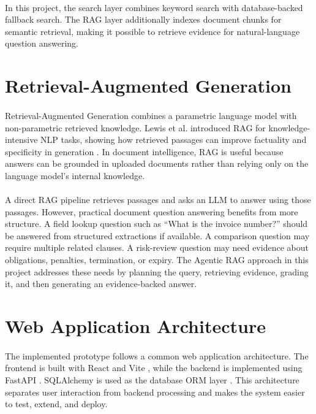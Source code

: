 \paragraph{} In this project, the search layer combines keyword search with database-backed fallback search. The RAG layer additionally indexes document chunks for semantic retrieval, making it possible to retrieve evidence for natural-language question answering.

\section{Retrieval-Augmented Generation}
\paragraph{} Retrieval-Augmented Generation combines a parametric language model with non-parametric retrieved knowledge. Lewis et al. introduced RAG for knowledge-intensive NLP tasks, showing how retrieved passages can improve factuality and specificity in generation \cite{lewis2020rag}. In document intelligence, RAG is useful because answers can be grounded in uploaded documents rather than relying only on the language model's internal knowledge.

\paragraph{} A direct RAG pipeline retrieves passages and asks an LLM to answer using those passages. However, practical document question answering benefits from more structure. A field lookup question such as ``What is the invoice number?'' should be answered from structured extractions if available. A comparison question may require multiple related clauses. A risk-review question may need evidence about obligations, penalties, termination, or expiry. The Agentic RAG approach in this project addresses these needs by planning the query, retrieving evidence, grading it, and then generating an evidence-backed answer.

\section{Web Application Architecture}
\paragraph{} The implemented prototype follows a common web application architecture. The frontend is built with React \cite{react2026} and Vite \cite{vite2026}, while the backend is implemented using FastAPI \cite{fastapi2026}. SQLAlchemy is used as the database ORM layer \cite{sqlalchemy2026}. This architecture separates user interaction from backend processing and makes the system easier to test, extend, and deploy.

